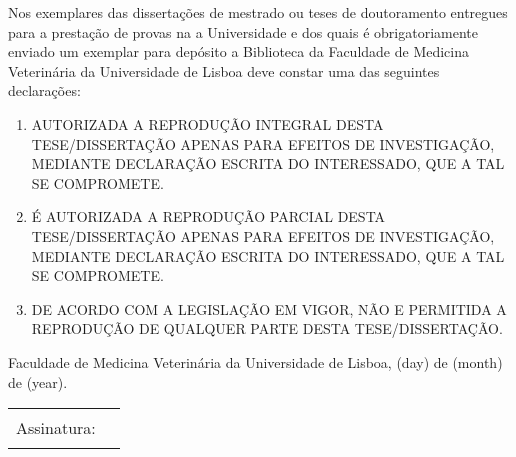 {\footnotesize Nos exemplares das dissertações de mestrado ou teses de doutoramento entregues para a prestação de provas na a
Universidade e dos quais é obrigatoriamente enviado um exemplar para depósito a Biblioteca da Faculdade de Medicina
Veterinária da Universidade de Lisboa deve constar uma das seguintes declarações:}
\begin{enumerate}
  \item [\IfStrEq{\theavailability(reproduction)}{I}{\memoryxbox}{\memoryemptybox}] 
        AUTORIZADA A REPRODUÇÃO INTEGRAL DESTA TESE/DISSERTAÇÃO APENAS PARA EFEITOS DE INVESTIGAÇÃO, 
        MEDIANTE DECLARAÇÃO ESCRITA DO INTERESSADO, QUE A TAL SE COMPROMETE.
  \item [\IfStrEq{\theavailability(reproduction)}{P}{\memoryxbox}{\memoryemptybox}] 
        É AUTORIZADA A REPRODUÇÃO PARCIAL DESTA TESE/DISSERTAÇÃO APENAS PARA EFEITOS DE INVESTIGAÇÃO, 
        MEDIANTE DECLARAÇÃO ESCRITA DO INTERESSADO, QUE A TAL SE COMPROMETE.
  \item [\IfStrEq{\theavailability(reproduction)}{N}{\memoryxbox}{\memoryemptybox}] 
        DE ACORDO COM A LEGISLAÇÃO EM VIGOR, NÃO E PERMITIDA A REPRODUÇÃO DE QUALQUER PARTE DESTA 
        TESE/DISSERTAÇÃO.
\end{enumerate}
  
Faculdade de Medicina Veterinária da Universidade de Lisboa, 
\thedocemxadate(day) de
\thedocemxadate(month) de
\thedocemxadate(year).\par
\vspace*{2ex}
\begin{tabularx}{\linewidth}{@{}lX@{}}
Assinatura: & \rule{\linewidth}{0.75pt}
\end{tabularx}
\vfill
\ntprintacknowledgementsblock
\egroup
